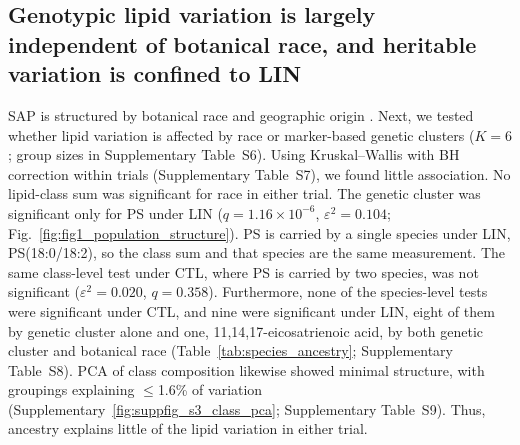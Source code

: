 \documentclass[9pt,twocolumn,twoside]{rilabRxiv}
\begin{document}
\subsection*{Genotypic lipid variation is largely independent of botanical race, and heritable variation is confined to LIN}

SAP is structured by botanical race and geographic origin \citep{Casa2008CommunityResourcesSorghum, Boatwright2022}. Next, we tested whether lipid variation is affected by race or marker-based genetic clusters ($K=6$; group sizes in Supplementary Table~S6). Using Kruskal–Wallis with BH correction within trials (Supplementary Table~S7), we found little association. No lipid-class sum was significant for race in either trial. The genetic cluster was significant only for PS under LIN ($q=1.16\times10^{-6}$, $\varepsilon^2=0.104$; Fig.~\ref{fig:fig1_population_structure}). PS is carried by a single species under LIN, PS(18:0/18:2), so the class sum and that species are the same measurement. The same class-level test under CTL, where PS is carried by two species, was not significant ($\varepsilon^2=0.020$, $q=0.358$). Furthermore, none of the species-level tests were significant under CTL, and nine were significant under LIN, eight of them by genetic cluster alone and one, 11,14,17-eicosatrienoic acid, by both genetic cluster and botanical race (Table~\ref{tab:species_ancestry}; Supplementary Table~S8). PCA of class composition likewise showed minimal structure, with groupings explaining $\le$1.6\% of variation (Supplementary~\ref{fig:suppfig_s3_class_pca}; Supplementary Table~S9). Thus, ancestry explains little of the lipid variation in either trial.
\end{document}
